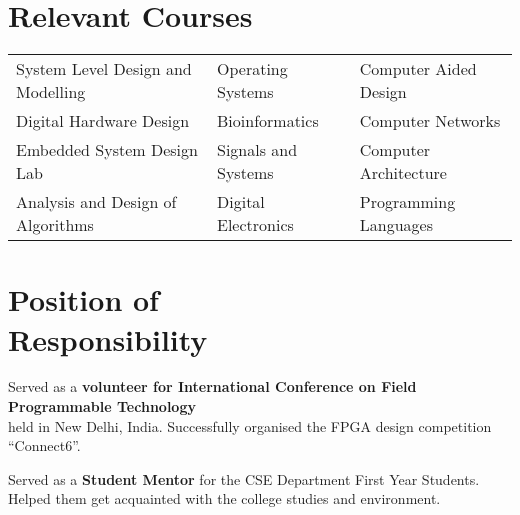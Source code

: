 \documentclass[margin,line]{resume}
\begin{document}
\begin{resume}
    \section{\mysidestyle Relevant Courses}
    \begin{tabular}{l l l}
    System Level Design and Modelling&Operating Systems&Computer Aided Design\\Digital Hardware Design&Bioinformatics&Computer Networks\\Embedded System Design Lab&Signals and Systems&Computer Architecture\\Analysis and Design of Algorithms&Digital Electronics&Programming Languages

    \end{tabular}	\vspace{1mm}
 
    \section{\mysidestyle Position of \\Responsibility}
    \begin{list2}
      \setlength{\itemindent}{-0.63em}
	\item Served as a \textbf{volunteer for International Conference on Field Programmable Technology}\\
	\hspace*{-3.3mm} held in New Delhi, India. Successfully organised the FPGA design competition ``Connect6''.%
	\item Served as a \textbf{Student Mentor} for the CSE Department First Year Students. Helped 
	them get 
	\hspace*{-3.3mm} acquainted with the college studies and environment.
      \end{list2}		\vspace{1mm}
 




\end{resume}
\end{document}
